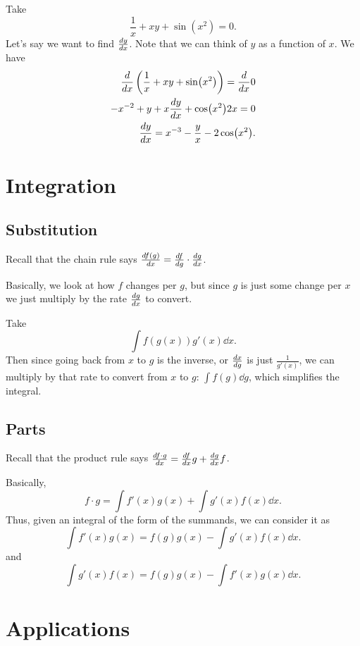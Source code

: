 \documentclass[../main.tex]{subfiles}
\begin{document}
Take
\[ \frac{1}{x} + xy + \sin(x^2) = 0. \]
Let's say we want to find \( \dv{y}{x} \).
Note that we can think of \( y \) as a function of \( x \).
We have
\begin{align*}
    \dv{x} \left( \frac{1}{x} + xy + \sin(x^2) \right) = \dv{x} 0 \\
    -x^{-2} + y + x \dv{y}{x} + \cos(x^2) 2x = 0 \\
    \dv{y}{x} = x^{-3} - \frac{y}{x} - 2\cos(x^2).
\end{align*}



\section{Integration}

\subsection{Substitution}

Recall that the chain rule says \( \dv{f(g)}{x} = \dv{f}{g} \cdot \dv{g}{x} \).



Basically, we look at how \( f \) changes per \( g \),
but since \( g \) is just some change per \( x \)
we just multiply by the rate \( \dv{g}{x} \) to convert.

Take \[ \int f(g(x))g'(x) \dd{x}. \]
Then since going back from \( x \) to \( g \) is the inverse,
or \( \dv{x}{g} \) is just \( \frac{1}{g'(x)} \),
we can multiply by that rate to convert from \( x \) to \( g \):
\( \int f(g) \dd{g} \), which simplifies the integral.


\subsection{Parts}

Recall that the product rule says
\( \dv{f \cdot g}{x} = \dv{f}{x} g + \dv{g}{x} f \).

\noindent


Basically,
\[ f \cdot g = \int f'(x)g(x) + \int g'(x)f(x) \dd x. \]
Thus, given an integral of the form of the summands, we can consider it as
\[ \int f'(x)g(x) = f(g)g(x) - \int g'(x)f(x) \dd x. \]
and
\[ \int g'(x)f(x) = f(g)g(x) - \int f'(x)g(x) \dd x. \]



\section{Applications}
\end{document}
